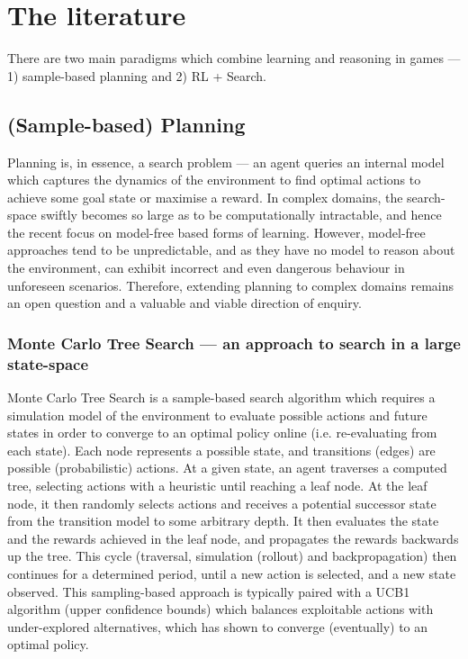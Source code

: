 \section{The literature}
There are two main paradigms which combine learning and reasoning in games --- 1) sample-based planning and 2) RL + Search. 
\subsection{(Sample-based) Planning}
 Planning is, in essence, a search problem --- an agent queries an internal model which captures the dynamics of the environment to find optimal actions to achieve some goal state or maximise a reward. In complex domains, the search-space swiftly becomes so large as to be computationally intractable, and hence the recent focus on model-free based forms of learning. However, model-free approaches tend to be unpredictable, and as they have no model to reason about the environment, can exhibit incorrect and even dangerous behaviour in unforeseen scenarios. Therefore, extending planning to complex domains remains an open question and a valuable and viable direction of enquiry.  
\subsubsection{Monte Carlo Tree Search --- an approach to search in a large state-space}
Monte Carlo Tree Search is a sample-based search algorithm which requires a simulation model of the environment to evaluate possible actions and future states in order to converge to an optimal policy online (i.e. re-evaluating from each state). 
Each node represents a possible state, and transitions (edges) are possible (probabilistic) actions. At a given state, an agent traverses a computed tree, selecting actions with a heuristic until reaching a leaf node. At the leaf node, it then randomly selects actions and receives a potential successor state from the transition model to some arbitrary depth. It then evaluates the state and the rewards achieved in the leaf node, and propagates the rewards backwards up the tree. This cycle  (traversal, simulation (rollout) and backpropagation) then continues for a determined period, until a new action is selected, and a new state observed. 
\newline \newline
This sampling-based approach is typically paired with a UCB1 algorithm (upper confidence bounds) which balances exploitable actions with under-explored alternatives, which has shown to converge (eventually) to an optimal policy. 


